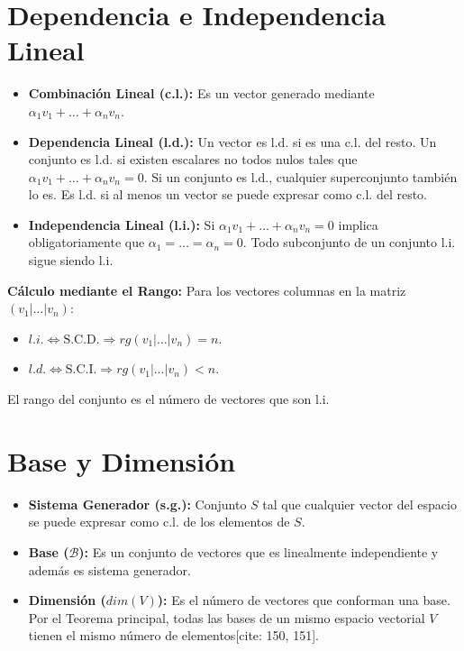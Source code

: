 \documentclass[12pt,a4paper]{article}
\begin{document}
\section{Dependencia e Independencia Lineal}
\begin{itemize}
    \item \textbf{Combinación Lineal (c.l.):} Es un vector generado mediante $\alpha_1 v_1 + \dots + \alpha_n v_n$.
    \item \textbf{Dependencia Lineal (l.d.):} Un vector es l.d. si es una c.l. del resto. Un conjunto es l.d. si existen escalares no todos nulos tales que $\alpha_1 v_1 + \dots + \alpha_n v_n = 0$. Si un conjunto es l.d., cualquier superconjunto también lo es. Es l.d. si al menos un vector se puede expresar como c.l. del resto.
    \item \textbf{Independencia Lineal (l.i.):} Si $\alpha_1 v_1 + \dots + \alpha_n v_n = 0$ implica obligatoriamente que $\alpha_1 = \dots = \alpha_n = 0$. Todo subconjunto de un conjunto l.i. sigue siendo l.i.
\end{itemize}

\textbf{Cálculo mediante el Rango:}
Para los vectores columnas en la matriz $(v_1|\dots|v_n)$:
\begin{itemize}
    \item $l.i. \Leftrightarrow \text{S.C.D.} \Rightarrow rg(v_1|\dots|v_n) = n$.
    \item $l.d. \Leftrightarrow \text{S.C.I.} \Rightarrow rg(v_1|\dots|v_n) < n$.
\end{itemize}
El rango del conjunto es el número de vectores que son l.i.

\section{Base y Dimensión}
\begin{itemize}
    \item \textbf{Sistema Generador (s.g.):} Conjunto $S$ tal que cualquier vector del espacio se puede expresar como c.l. de los elementos de $S$.
    \item \textbf{Base ($\mathcal{B}$):} Es un conjunto de vectores que es linealmente independiente y además es sistema generador.
    \item \textbf{Dimensión ($dim(V)$):} Es el número de vectores que conforman una base. Por el Teorema principal, todas las bases de un mismo espacio vectorial $V$ tienen el mismo número de elementos[cite: 150, 151].
\end{itemize}
\end{document}
